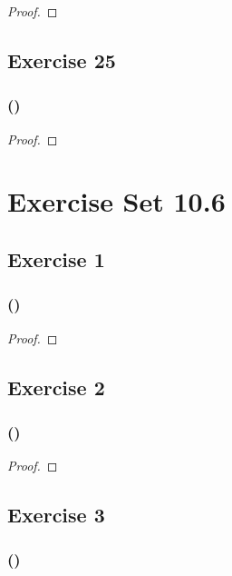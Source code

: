 \documentclass[14pt]{extarticle}
\begin{document}
\begin{proof}

\end{proof}

\subsection{Exercise 25}

\subsubsection{()}

\begin{proof}

\end{proof}

\section{Exercise Set 10.6}
\subsection{Exercise 1}

\subsubsection{()}

\begin{proof}

\end{proof}

\subsection{Exercise 2}

\subsubsection{()}

\begin{proof}

\end{proof}

\subsection{Exercise 3}

\subsubsection{()}
\end{document}
